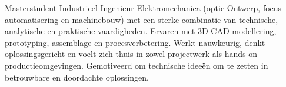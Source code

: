 \par{
    Masterstudent Industrieel Ingenieur Elektromechanica (optie Ontwerp, focus automatisering en machinebouw) met een sterke combinatie van technische, analytische en praktische vaardigheden. Ervaren met 3D-CAD-modellering, prototyping, assemblage en procesverbetering. Werkt nauwkeurig, denkt oplossingsgericht en voelt zich thuis in zowel projectwerk als hands-on productieomgevingen. Gemotiveerd om technische ideeën om te zetten in betrouwbare en doordachte oplossingen.
}
